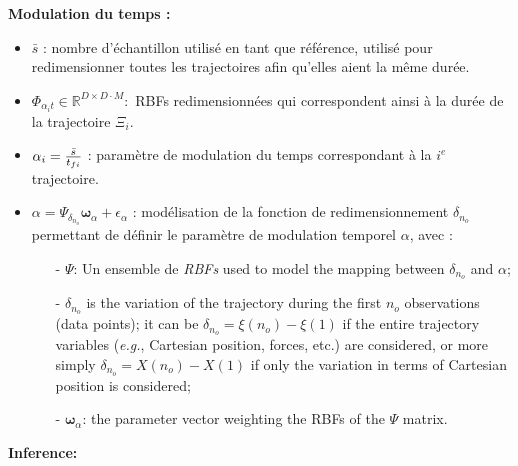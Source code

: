 \documentclass[utf8]{frontiersSCNS} %
\begin{document}
\textbf{Modulation du temps :}
\begin{itemize}
\item $\bar{s}$ : nombre d'échantillon utilisé en tant que référence, utilisé pour redimensionner toutes les trajectoires afin qu'elles aient la même durée.
\item $\Phi_{\alpha_i t} \in \mathbb{R}^{D\times D \cdot M} :$ RBFs redimensionnées qui correspondent ainsi à la durée de la trajectoire $\Xi_i$.
\item $\alpha_i = { \bar{s} \over t_{fi}}$ : paramètre de modulation du temps correspondant à la $i^e$ trajectoire.
\item $\alpha = \Psi_{\delta_{n_o}}\boldsymbol{\omega}_\alpha + \epsilon_\alpha$ : modélisation de la fonction de redimensionnement $\delta_{n_o}$ permettant de définir le paramètre de modulation temporel $\alpha$, avec :

\begin{itemize}
\item[-] $\Psi$: Un ensemble de \textit{RBFs} used to model the mapping between $\delta_{n_o}$ and $\alpha$;
\item[-] $\delta_{n_o}$ is the variation of the trajectory during the first $n_o$ observations (data points); it can be $\delta_{n_o}=\xi(n_o) - \xi(1)$ if the entire trajectory variables (\textit{e.g.}, Cartesian position, forces, etc.) are considered, or more simply $\delta_{n_o}= X(n_o) - X(1)$ if only the variation in terms of Cartesian position is considered;
\item[-] $\boldsymbol{\omega}_\alpha$: the parameter vector weighting the RBFs of the $\Psi$ matrix. 

\end{itemize}
\end{itemize}
\textbf{Inference:}
\end{document}
